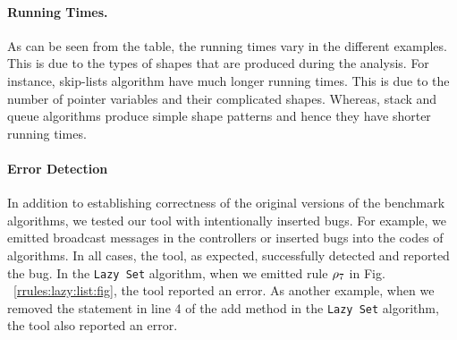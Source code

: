 \paragraph{Running Times.}
As can be seen from the table, the running times
vary in the different examples.
%
This is due to the types of shapes that are produced during the analysis.
%
For instance, skip-lists algorithm have much longer running times. This is due to 
the number of pointer variables and their complicated shapes. Whereas, stack and queue algorithms 
produce simple shape patterns and hence they have shorter running times.
\paragraph{Error Detection}
 In addition to establishing correctness of the original versions of the
benchmark algorithms, we tested our tool with intentionally inserted bugs. For example, we emitted broadcast messages in the controllers or inserted bugs into the codes of algorithms. In all cases, the tool, as expected, successfully detected and reported the bug. In the {\tt Lazy Set} algorithm, when we emitted rule $\rho_7$ in Fig. ~\ref{rrules:lazy:list:fig}, the tool reported an error. As another example, when we removed the statement in line 4 of 
the add method in the {\tt Lazy Set} algorithm, the tool also reported an error.
 



